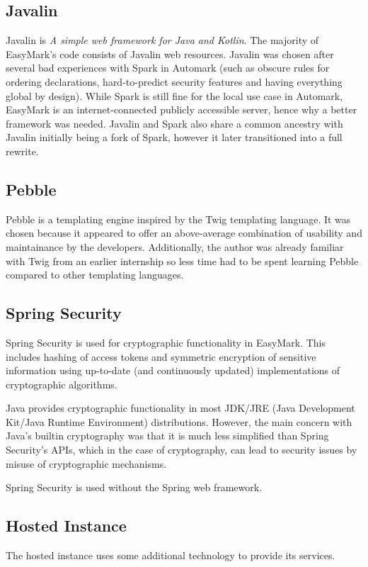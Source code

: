 \documentclass[12pt,a4paper,oneside]{report}
\begin{document}
	\subsection{Javalin}
	Javalin is \emph{A simple web framework for Java and Kotlin}\parencite{javalinwebsite}. The majority of EasyMark's code consists of Javalin web resources. Javalin was chosen after several bad experiences with Spark in Automark (such as obscure rules for ordering declarations, hard-to-predict security features and having everything global by design). While Spark is still fine for the local use case in Automark, EasyMark is an internet-connected publicly accessible server, hence why a better framework was needed. Javalin and Spark also share a common ancestry with Javalin initially being a fork of Spark, however it later transitioned into a full rewrite.

	\subsection{Pebble}
	Pebble is a templating engine inspired by the Twig templating language\parencite{pebblewebsite}. It was chosen because it appeared to offer an above-average combination of usability and maintainance by the developers. Additionally, the author was already familiar with Twig from an earlier internship so less time had to be spent learning Pebble compared to other templating languages.

	\subsection{Spring Security}
	Spring Security is used for cryptographic functionality in EasyMark. This includes hashing of access tokens and symmetric encryption of sensitive information using up-to-date (and continuously updated) implementations of cryptographic algorithms\parencite{springsecuritywebsite}.

	\pagebreak
	Java provides cryptographic functionality in most JDK/JRE (Java Development Kit/Java Runtime Environment) distributions. However, the main concern with Java's builtin cryptography was that it is much less simplified than Spring Security's APIs, which in the case of cryptography, can lead to security issues by misuse of cryptographic mechanisms\parencite{javacryptographyusesinthewild}.

	Spring Security is used without the Spring web framework.

	\subsection{Hosted Instance}
	The hosted instance uses some additional technology to provide its services.
\end{document}
